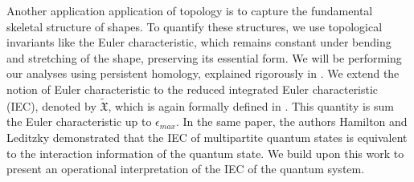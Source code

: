 \documentclass{article}
\begin{document}
Another application application of topology is to capture the fundamental skeletal structure of shapes. To quantify these structures, we use topological invariants like the Euler characteristic, which remains constant under bending and stretching of the shape, preserving its essential form. We will be performing our analyses using persistent homology, explained rigorously in \cite{hamilton2023probing}. We extend the notion of Euler characteristic to the reduced integrated Euler characteristic (IEC), denoted by $\tilde{\mathfrak{X}}$, which is again formally defined in \cite{hamilton2023probing}. This quantity is sum the Euler characteristic up to $\epsilon_{max}$. In the same paper, the authors Hamilton and Leditzky demonstrated that the IEC of multipartite quantum states is equivalent to the interaction information of the quantum state. We build upon this work to present an operational interpretation of the IEC of the quantum system.



\end{document}
